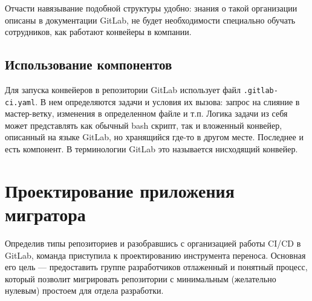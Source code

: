 Отчасти навязывание подобной структуры удобно: знания о такой организации описаны в документации GitLab,
не будет необходимости специально обучать сотрудников, как работают конвейеры в компании.

\subsection{Использование компонентов} \label{subsec:component-usage}
Для запуска конвейеров в репозитории GitLab использует файл \texttt{.gitlab-ci.yaml}\cite{gitlab-ci-yaml}.
В нем определяются задачи и условия их вызова: запрос на слияние в мастер-ветку, изменения в определенном файле и т.п.
Логика задачи из себя может представлять как обычный bash скрипт\cite{bash}, так и вложенный конвейер, описанный на языке GitLab,
но хранящийся где-то в другом месте.
Последнее и есть компонент.
В терминологии GitLab это называется нисходящий конвейер\cite{downstream-pipeline}.

\section{Проектирование приложения мигратора} \label{sec:gitlab-migrator-app}

Определив типы репозиториев и разобравшись с организацией работы CI/CD в GitLab, команда приступила к проектированию инструмента переноса.
Основная его цель — предоставить группе разработчиков отлаженный и понятный процесс,
который позволит мигрировать репозитории с минимальным (желательно нулевым) простоем для отдела разработки.

